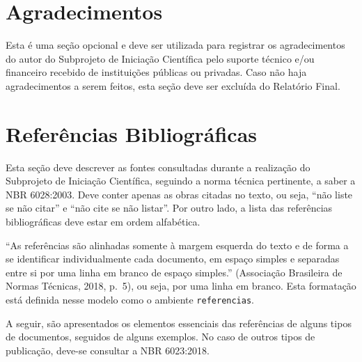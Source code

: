 \documentclass[10pt,a4paper]{article}
\begin{document}
\section*{Agradecimentos}
Esta é uma seção opcional e deve ser utilizada para registrar os agradecimentos do autor do Subprojeto de Iniciação Científica pelo suporte técnico e/ou financeiro recebido de instituições públicas ou privadas. Caso não haja agradecimentos a serem feitos, esta seção deve ser excluída do Relatório Final.

\section*{Referências Bibliográficas}
Esta seção deve descrever as fontes consultadas durante a realização do Subprojeto de Iniciação Científica, seguindo a norma técnica pertinente, a saber a NBR 6028:2003. Deve conter apenas as obras citadas no texto, ou seja, ``não liste se não citar'' e ``não cite se não listar''. Por outro lado, a lista das referências bibliográficas deve estar em ordem alfabética.

\vspace{\baselineskip}
``As referências são alinhadas somente à margem esquerda do texto e de forma a se identificar individualmente cada documento, em espaço simples e separadas entre si por uma linha em branco de espaço simples.'' (Associação Brasileira de Normas Técnicas, 2018, p.~5), ou seja, por uma linha em branco. Esta formatação está definida nesse modelo como o ambiente \texttt{referencias}.

\vspace{\baselineskip}
A seguir, são apresentados os elementos essenciais das referências de alguns tipos de documentos, seguidos de alguns exemplos. No caso de outros tipos de publicação, deve-se consultar a NBR 6023:2018.
\end{document}
